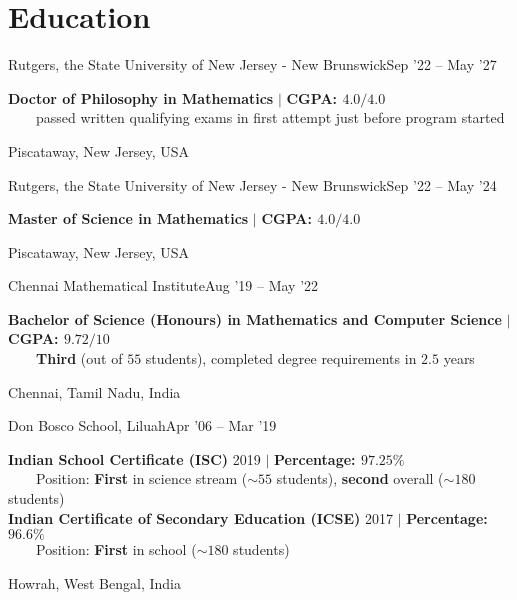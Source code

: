 \section{Education}
\resumeSubheading
{Rutgers, the State University of New Jersey - New Brunswick}{Sep '22 -- May '27}
{\begin{minipage}{15cm} \color{grey}\textbf{Doctor of Philosophy in Mathematics}  $|$ \textbf{CGPA: $4.0/4.0$}\\
$\phantom{\qquad}$passed written qualifying exams in first attempt just before program started \end{minipage}
}{Piscataway, New Jersey, USA}

\resumeSubheading
{Rutgers, the State University of New Jersey - New Brunswick}{Sep '22 -- May '24}
{\begin{minipage}{15cm} \color{grey}\textbf{Master of Science in Mathematics}  $|$ \textbf{CGPA: $4.0/4.0$}
\end{minipage}
}{Piscataway, New Jersey, USA}

\resumeSubheading
{Chennai Mathematical Institute}{Aug '19 -- May '22}
{\begin{minipage}{15cm} \color{grey}\textbf{Bachelor of Science (Honours) in Mathematics and Computer Science} $|$ \textbf{CGPA: $9.72/10$} \\
$\phantom{\qquad}$\textbf{Third} (out of $55$ students), completed degree requirements in $2.5$ years\end{minipage}
}{Chennai, Tamil Nadu, India}
      
\resumeSubheading
{Don Bosco School, Liluah}{Apr '06 -- Mar '19}
{\begin{minipage}{15cm} \color{grey}\textbf{Indian School Certificate (ISC)} 2019 $|$ \textbf{Percentage: $97.25\%$} \\
$\phantom{\qquad}$Position: \textbf{First} in science stream ($\sim55$ students), \textbf{second} overall ($\sim180$ students) \\ 
\textbf{Indian Certificate of Secondary Education (ICSE)} 2017 $|$ \textbf{Percentage: $96.6\%$} \\
$\phantom{\qquad}$Position: \textbf{First} in school ($\sim180$ students) \end{minipage}
}{Howrah, West Bengal, India}


